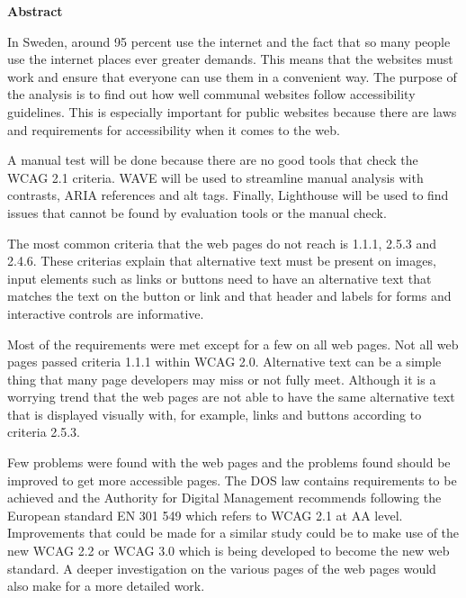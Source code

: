 \documentclass[11p]{article}
\begin{document}
    \begin{center}
        \large
        \vspace{0.9cm}
        \textbf{Abstract}
    \end{center}
    In Sweden, around 95 percent use the internet \textcite{SCB} and the fact that so many people use the internet places ever greater demands.
    This means that the websites must work and ensure that everyone can use them in a convenient way.
    The purpose of the analysis is to find out how well communal websites follow accessibility guidelines.
    This is especially important for public websites because there are laws and requirements for accessibility when it comes to the web.

    A manual test will be done because there are no good tools that check the WCAG 2.1 criteria.
    WAVE will be used to streamline manual analysis with contrasts, ARIA references and alt tags.
    Finally, Lighthouse will be used to find issues that cannot be found by evaluation tools or the manual check.

    The most common criteria that the web pages do not reach is 1.1.1, 2.5.3 and 2.4.6.
    These criterias explain that alternative text must be present on images, input elements such as links or buttons need to have an alternative text that matches the text on the button or link and that header and labels for forms and interactive controls are informative.

    Most of the requirements were met except for a few on all web pages.
    Not all web pages passed criteria 1.1.1 within WCAG 2.0.
    Alternative text can be a simple thing that many page developers may miss or not fully meet.
    Although it is a worrying trend that the web pages are not able to have the same alternative text that is displayed visually with, for example, links and buttons according to criteria 2.5.3.

    Few problems were found with the web pages and the problems found should be improved to get more accessible pages.
    The DOS law contains requirements to be achieved and the Authority for Digital Management recommends following the European standard EN 301 549 which refers to WCAG 2.1 at AA level.
    Improvements that could be made for a similar study could be to make use of the new WCAG 2.2 or WCAG 3.0 which is being developed to become the new web standard.
    A deeper investigation on the various pages of the web pages would also make for a more detailed work.

    \newpage
    \tableofcontents
\end{document}
